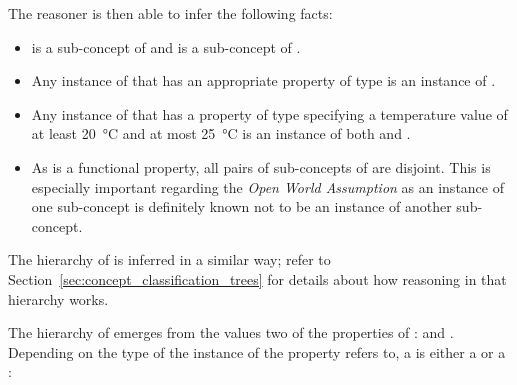 The  reasoner is then able to infer the following facts:
\begin{itemize}
  \item {} is a sub-concept of  and  is a sub-concept of .
  \item Any instance of  that has an appropriate property of type  is an instance of .
  \item Any instance of  that has a property of type  specifying a temperature value of at least \SI{20}{\celsius} and at most \SI{25}{\celsius} is an instance of both  and .
  \item As  is a functional property, all pairs of sub-concepts of  are disjoint. This is especially important regarding the \emph{Open World Assumption} as an instance of one sub-concept is definitely known not to be an instance of another sub-concept.
\end{itemize}

The hierarchy of  is inferred in a similar way; refer to Section~\ref{sec:concept_classification_trees} for details about how reasoning in that hierarchy works.

The hierarchy of  emerges from the values two of the properties of :  and . Depending on the type of the instance of  the property  refers to, a  is either a  or a :

\noindent{}

